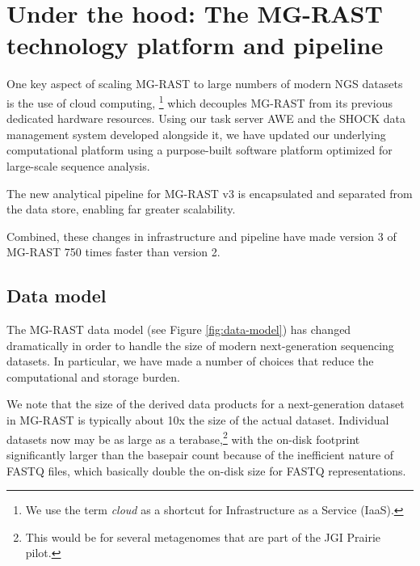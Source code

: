\documentclass[12pt,fullpage]{report}
\begin{document}
\chapter{Under the hood: The MG-RAST technology platform and pipeline}


One key aspect of scaling MG-RAST to large numbers of modern NGS datasets is the use of cloud computing,
\footnote{We use the term \textit{cloud} as a shortcut for Infrastructure as a Service (IaaS).}
 which decouples MG-RAST from its previous dedicated hardware resources. Using our task server AWE \cite{AWE} and the SHOCK data management system developed alongside it, we have updated our underlying computational platform using a purpose-built software platform optimized for large-scale sequence analysis.

The new analytical pipeline for MG-RAST v3
is encapsulated and separated from the data store, enabling far greater scalability.

Combined, these changes in infrastructure and pipeline have made version 3 of MG-RAST 750 times faster than version 2.

% 
% 



\section{Data model}

The MG-RAST data model (see Figure \ref{fig:data-model}) has changed dramatically in order to handle the size of modern next-generation sequencing datasets. In particular, we have made a number of choices that reduce the computational and storage burden.

We note that the size of the derived data products for a next-generation dataset in MG-RAST is typically about 10x the size of the actual dataset. Individual datasets now may be as large as a terabase,\footnote{This would be for several metagenomes that are part of the JGI Prairie pilot.} with the on-disk footprint significantly larger than the basepair count because of the inefficient nature of FASTQ files, which  basically double the on-disk size for FASTQ representations.
\end{document}
